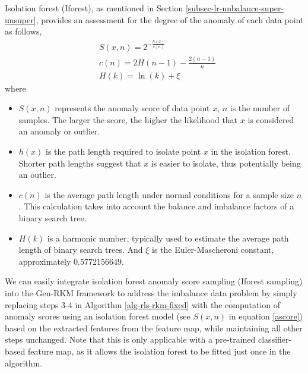 Isolation forest (Iforest)\cite{liu2008isolation}, as mentioned in Section \ref{subsec-lr-unbalance-super-unsuper}, provides an assessment for the degree of the anomaly of each data point as follows,
\begin{align}
&S(x, n) = 2^{-\frac{h(x)}{c(n)}}\label{ascore} \\
&c(n) = 2H(n-1) - \frac{2(n-1)}{n} \\
&H(k) = \ln(k) + \xi
\end{align}
where \begin{itemize}
    \item $S(x, n)$ represents the anomaly score of data point $x$, $n$ is the number of samples. The larger the score, the higher the likelihood that $x$ is considered an anomaly or outlier. 
    \item $h(x)$ is the path length required to isolate point $x$ in the isolation forest. Shorter path lengths suggest that $x$ is easier to isolate, thus potentially being an outlier.
    \item $c(n)$ is the average path length under normal conditions for a sample size $n$. This calculation takes into account the balance and imbalance factors of a binary search tree.
    \item $H(k)$  is a harmonic number, typically used to estimate the average path length of binary search trees. And $\xi$ is the Euler-Mascheroni constant, approximately 0.5772156649.
\end{itemize}
We can easily integrate isolation forest anomaly score sampling (Iforest sampling) into the Gen-RKM framework to address the imbalance data problem by simply replacing steps 3-4 in Algorithm \ref{alg-rls-rkm-fixed} with the computation of anomaly scores using an isolation forest model (see $S(x, n)$ in equation \ref{ascore}) based on the extracted features from the feature map,  while maintaining all other steps unchanged. Note that this is only applicable with a pre-trained classifier-based feature map, as it allows the isolation forest to be fitted just once in the algorithm.



